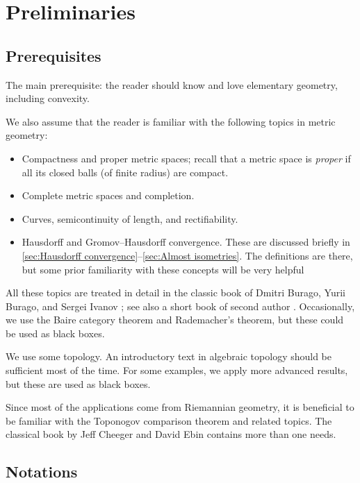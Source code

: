 
\chapter{Preliminaries}\label{chap:prelim}

\section{Prerequisites}

The main prerequisite: the reader should know and love elementary geometry, including convexity.

We also assume that the reader is familiar with the following topics in metric geometry:
\begin{itemize}
\item Compactness and proper metric spaces;
recall that a metric space is \emph{proper} if all its closed balls (of finite radius) are compact.
\item Complete metric spaces and completion.
\item Curves, semicontinuity of length, and rectifiability.
\item Hausdorff and Gromov--Hausdorff convergence.
These are discussed briefly in \ref{sec:Hausdorff convergence}--\ref{sec:Almost isometries}.
The definitions are there, but some prior familiarity with these concepts will be very helpful
\end{itemize}
All these topics are treated in detail in the classic book of Dmitri Burago, Yurii Burago, and Sergei Ivanov \cite{burago-burago-ivanov}; see also a short book of second author \cite{petrunin2023pure}.
Occasionally, we use the Baire category theorem and Rademacher's theorem, but these could be used as black boxes.

We use some topology. 
An introductory text in algebraic topology should be sufficient most of the time.
For some examples, we apply more advanced results, but these are used as black boxes.

Since most of the applications come from Riemannian geometry, it is beneficial to be familiar with the Toponogov comparison theorem and related topics.
The classical book by Jeff Cheeger and David Ebin \cite{cheeger-ebin} contains more than one needs.

\section{Notations}

